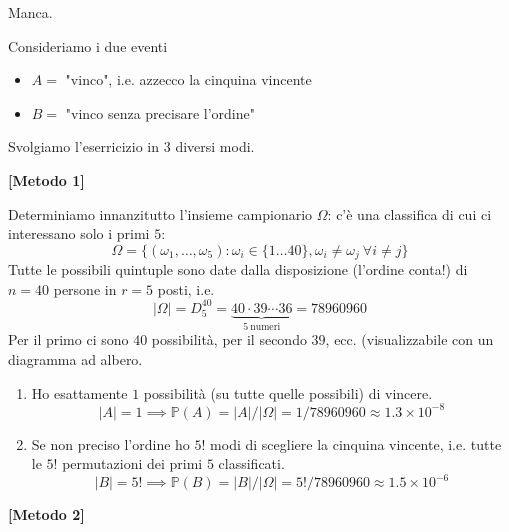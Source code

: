 Manca.
\Soluzione

Consideriamo i due eventi
\begin{itemize}
\item $A=$ "vinco", i.e. azzecco la cinquina vincente
\item $B=$ "vinco senza precisare l'ordine"
\end{itemize}

Svolgiamo l'eserricizio in $3$ diversi modi.

\textbf{[Metodo 1]}

Determiniamo innanzitutto l'insieme campionario $\Omega $: c'è una classifica di cui ci interessano solo i primi $5$:
\begin{equation*}
\Omega =\{( \omega _{1} ,\dotsc ,\omega _{5}) :\omega _{i} \in \{1\dotsc 40\} ,\omega _{i} \neq \omega _{j} \ \forall i\neq j\}
\end{equation*}
Tutte le possibili quintuple sono date dalla disposizione (l'ordine conta!) di $n=40$ persone in $r=5$ posti, i.e.
\begin{equation*}
| \Omega | =D_{5}^{40} =\underbrace{40\cdot 39\cdots 36}_{5\ \text{numeri}} =78960960
\end{equation*}
Per il primo ci sono $40$ possibilità, per il secondo $39$, ecc. (visualizzabile con un diagramma ad albero.
\begin{enumerate}
\item Ho esattamente $1$ possibilità (su tutte quelle possibili) di vincere.\begin{equation*}
| A| =1\mathbb{\implies P}( A) =| A| /| \Omega | =1/78960960\approx 1.3\times 10^{-8}
\end{equation*}
\item Se non preciso l'ordine ho $5!$ modi di scegliere la cinquina vincente, i.e. tutte le $5!$ permutazioni dei primi $5$ classificati.\begin{equation*}
| B| =5!\mathbb{\implies P}( B) =| B| /| \Omega | =5!/78960960\approx 1.5\times 10^{-6}
\end{equation*}
\end{enumerate}

\textbf{[Metodo 2]}

